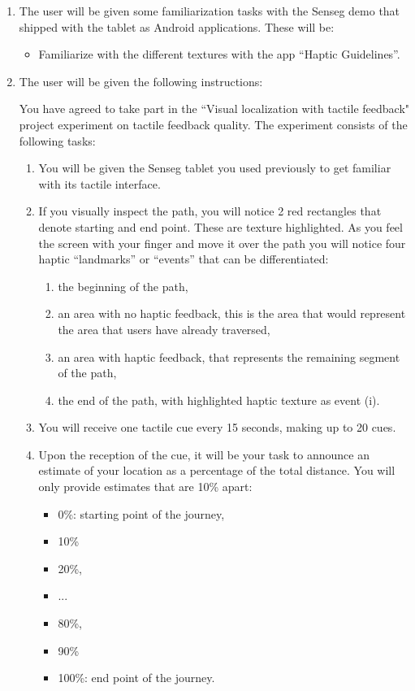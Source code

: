 \begin{enumerate}

\item The user will be given some familiarization tasks with the Senseg demo that shipped with the tablet as Android applications. These will be:

\begin{itemize}
\item Familiarize with the different textures with the app ``Haptic Guidelines''.
\end{itemize}

\item The user will be given the following instructions:

\begin{framed}
You have agreed to take part in the ``Visual localization with tactile feedback" project experiment on tactile feedback quality. The experiment consists of the following tasks:

\begin{enumerate}
\item You will be given the Senseg tablet you used previously to get familiar with its tactile interface.

\item If you visually inspect the path, you will notice 2 red rectangles that denote starting and end point. These are texture highlighted. As you feel the screen with your finger and move it over the path you will notice four haptic ``landmarks'' or ``events'' that can be differentiated: 

\begin{enumerate}
\item the beginning of the path,
\item an area with no haptic feedback, this is the area that would represent the area that users have already traversed,
\item an area with haptic feedback, that represents the remaining segment of the path,
\item the end of the path, with highlighted haptic texture as event (i).
\end{enumerate}
\item You will receive one tactile cue every 15 seconds, making up to 20 cues. 

\item Upon the reception of the cue, it will be your task to announce an estimate of your location as a percentage of the total distance. You will only provide estimates that are 10\% apart:
\begin{itemize}
\item 0\%: starting point of the journey,
\item 10\%
\item 20\%,
\item ...
\item 80\%,
\item 90\%
\item 100\%: end point of the journey.
 

\end{itemize}
\end{enumerate}
\end{framed}
\end{enumerate}
